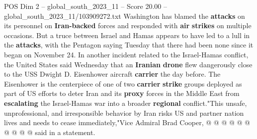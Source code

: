 \begin{textsample}{POS Dim 2 – global\_south\_2023\_11 – Score 20.00 – global\_south\_2023\_11/103909272.txt}
Washington has blamed the \textbf{attacks} on its personnel on \textbf{Iran-backed} forces and responded with \textbf{air} \textbf{strikes} on multiple occasions.
But a truce between Israel and Hamas appears to have led to a lull in the \textbf{attacks}, with the Pentagon saying Tuesday that there had been none since it began on November 24.
In another incident related to the Israel-Hamas conflict, the United States said Wednesday that an \textbf{Iranian} \textbf{drone} flew dangerously close to the USS Dwight D.
Eisenhower aircraft \textbf{carrier} the day before.
The Eisenhower is the centerpiece of one of two \textbf{carrier} \textbf{strike} groups deployed as part of US efforts to deter Iran and its \textbf{proxy} forces in the Middle East from \textbf{escalating} the Israel-Hamas war into a broader \textbf{regional} conflict."This unsafe, unprofessional, and irresponsible behavior by Iran risks US and partner nation lives and needs to cease immediately,"Vice Admiral Brad Cooper, @ @ @ @ @ @ @ @ @ @ said in a statement.

\end{textsample}
